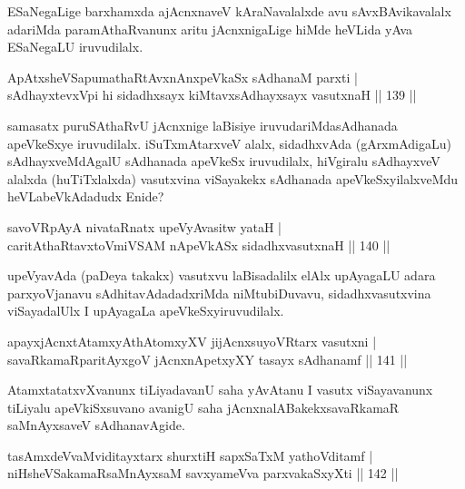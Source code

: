 \begin{artha}
ESaNegaLige barxhamxda ajAcnxnaveV kAraNavalalxde avu sAvxBAvikavalalx adariMda paramAthaRvanunx aritu jAcnxnigaLige hiMde heVLida yAva ESaNegaLU iruvudilalx.
\end{artha}

\begin{shl}
ApAtxsheVSapumathaRtAvxnAnxpeVkaSx sAdhanaM parxti |\\
sAdhayxtevxV\s pi hi sidadhxsayx kiMtavxsAdhayxsayx vasutxnaH \hfill || 139 ||
\end{shl}

\begin{artha}
samasatx puruSAthaRvU jAcnxnige laBisiye iruvudariMda\break sAdhanada apeVkeSxye iruvudilalx. iSuTxmAtarxveV alalx, sidadhxvAda (gArxmAdigaLu) sAdhayxveMdAgalU sAdhanada apeVkeSx iruvudilalx, hiVgiralu sAdhayxveV alalxda (huTiTxlalxda) vasutxvina viSayakekx sAdhanada apeVkeSxyilalxveMdu heVLabeVkAdadudx Enide? 
\end{artha}

\begin{shl}
savoVRpAyA nivataRnatx upeVyAvasitw yataH |\\
caritAthaRtavxtoV\s miVSAM nApeVkASx sidadhxvasutxnaH \hfill || 140 ||
\end{shl}

\begin{artha}
upeVyavAda (paDeya takakx) vasutxvu laBisadalilx elAlx upAyagaLU adara parxyoVjanavu sAdhitavAdadadxriMda niMtubiDuvavu, sidadhxvasutxvina viSayadalUlx I upAyagaLa apeVkeSxyiruvudilalx.
\end{artha}%


\begin{shl}
apayxjAcnxtAtamxyAthAtomxyXV jijAcnxsuyoVR\s tarx vasutxni |\\
savaRkamaRparitAyxgoV jAcnxnApetxyXY tasayx sAdhanamf \hfill || 141 ||
\end{shl}

\begin{artha}
AtamxtatatxvXvanunx tiLiyadavanU saha yAvAtanu I vasutx viSayavanunx tiLiyalu apeVkiSxsuvano avanigU saha jAcnxnalABakekx\break savaRkamaR saMnAyxsaveV sAdhanavAgide.
\end{artha}

\begin{shl}
tasAmxdeVvaMviditayxtarx shurxtiH sapxSaTxM yathoVditamf |\\
niHsheVSakamaRsaMnAyxsaM savxyameVva parxvakaSxyXti \hfill || 142 ||
\end{shl}

